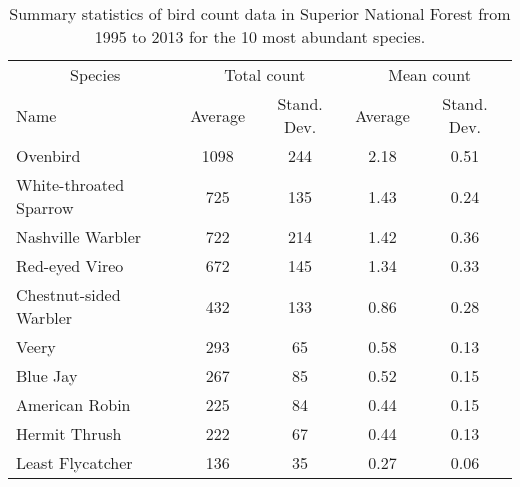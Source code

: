 \begin{table}[ht]
\centering
\caption{Summary statistics of bird count data in Superior National Forest from
1995 to 2013 for the 10 most abundant species.} 
\label{tab:bird}
\begin{tabular}{lcccc}
  \hline
  \multicolumn{1}{c}{Species} & \multicolumn{2}{c}{Total count} & \multicolumn{2}{c}{Mean count} \\
Name & Average & Stand. Dev. &Average & Stand. Dev.  \\ 
  \hline
Ovenbird & 1098 & 244 & 2.18 & 0.51 \\ 
  White-throated Sparrow & 725 & 135 & 1.43 & 0.24 \\ 
  Nashville Warbler & 722 & 214 & 1.42 & 0.36 \\ 
  Red-eyed Vireo & 672 & 145 & 1.34 & 0.33 \\ 
  Chestnut-sided Warbler & 432 & 133 & 0.86 & 0.28 \\ 
  Veery & 293 & 65 & 0.58 & 0.13 \\ 
  Blue Jay & 267 & 85 & 0.52 & 0.15 \\ 
  American Robin & 225 & 84 & 0.44 & 0.15 \\ 
  Hermit Thrush & 222 & 67 & 0.44 & 0.13 \\ 
  Least Flycatcher & 136 & 35 & 0.27 & 0.06 \\ 
   \hline
\end{tabular}
\end{table}